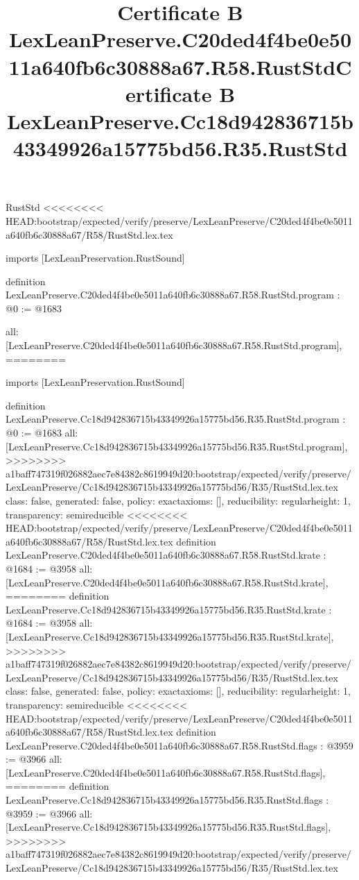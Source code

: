 \begin{lexlean}{RustStd}
<<<<<<<< HEAD:bootstrap/expected/verify/preserve/LexLeanPreserve/C20ded4f4be0e5011a640fb6c30888a67/R58/RustStd.lex.tex
\title{Certificate B LexLeanPreserve.C20ded4f4be0e5011a640fb6c30888a67.R58.RustStd}
\begin{coremodule}
imports [LexLeanPreservation.RustSound]

definition LexLeanPreserve.C20ded4f4be0e5011a640fb6c30888a67.R58.RustStd.program : @0 := @1683 {
  all: [LexLeanPreserve.C20ded4f4be0e5011a640fb6c30888a67.R58.RustStd.program],
========
\title{Certificate B LexLeanPreserve.Cc18d942836715b43349926a15775bd56.R35.RustStd}
\begin{coremodule}
imports [LexLeanPreservation.RustSound]

definition LexLeanPreserve.Cc18d942836715b43349926a15775bd56.R35.RustStd.program : @0 := @1683 {
  all: [LexLeanPreserve.Cc18d942836715b43349926a15775bd56.R35.RustStd.program],
>>>>>>>> a1baff747319f026882aec7e84382c8619949d20:bootstrap/expected/verify/preserve/LexLeanPreserve/Cc18d942836715b43349926a15775bd56/R35/RustStd.lex.tex
  class: false,
  generated: false,
  policy: exact{axioms: []},
  reducibility: regular{height: 1},
  transparency: semireducible
}
<<<<<<<< HEAD:bootstrap/expected/verify/preserve/LexLeanPreserve/C20ded4f4be0e5011a640fb6c30888a67/R58/RustStd.lex.tex
definition LexLeanPreserve.C20ded4f4be0e5011a640fb6c30888a67.R58.RustStd.krate : @1684 := @3958 {
  all: [LexLeanPreserve.C20ded4f4be0e5011a640fb6c30888a67.R58.RustStd.krate],
========
definition LexLeanPreserve.Cc18d942836715b43349926a15775bd56.R35.RustStd.krate : @1684 := @3958 {
  all: [LexLeanPreserve.Cc18d942836715b43349926a15775bd56.R35.RustStd.krate],
>>>>>>>> a1baff747319f026882aec7e84382c8619949d20:bootstrap/expected/verify/preserve/LexLeanPreserve/Cc18d942836715b43349926a15775bd56/R35/RustStd.lex.tex
  class: false,
  generated: false,
  policy: exact{axioms: []},
  reducibility: regular{height: 1},
  transparency: semireducible
}
<<<<<<<< HEAD:bootstrap/expected/verify/preserve/LexLeanPreserve/C20ded4f4be0e5011a640fb6c30888a67/R58/RustStd.lex.tex
definition LexLeanPreserve.C20ded4f4be0e5011a640fb6c30888a67.R58.RustStd.flags : @3959 := @3966 {
  all: [LexLeanPreserve.C20ded4f4be0e5011a640fb6c30888a67.R58.RustStd.flags],
========
definition LexLeanPreserve.Cc18d942836715b43349926a15775bd56.R35.RustStd.flags : @3959 := @3966 {
  all: [LexLeanPreserve.Cc18d942836715b43349926a15775bd56.R35.RustStd.flags],
>>>>>>>> a1baff747319f026882aec7e84382c8619949d20:bootstrap/expected/verify/preserve/LexLeanPreserve/Cc18d942836715b43349926a15775bd56/R35/RustStd.lex.tex
}}}
\end{coremodule}}
\end{coremodule}
\end{lexlean}
